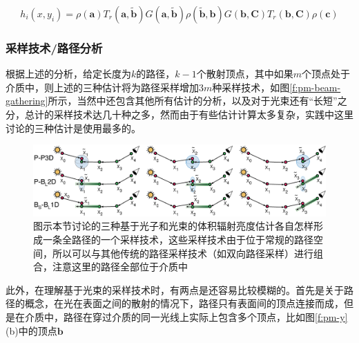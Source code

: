 \begin{equation}
	h_i(x,y_i)=\rho(\mathbf{a})T_r(\mathbf{a},\tilde{\mathbf{b}})G(\mathbf{a},\tilde{\mathbf{b}})\rho(\tilde{\mathbf{b}},\mathbf{b})G(\mathbf{b},\mathbf{C})T_r(\mathbf{b},\mathbf{C})\rho(\mathbf{c})
\end{equation}





\subsubsection{采样技术/路径分析}
根据上述的分析，给定长度为$k$的路径，$k-1$个散射顶点，其中如果$m$个顶点处于介质中，则上述的三种估计将为路径采样增加3$m$种采样技术，如图\ref{f:pm-beam-gathering}所示，当然\cite{a:UnifyingPointsBeamsandPathsinVolumetricLightTransportSimulation}中还包含其他所有估计的分析，以及对于光束还有“长短”之分，总计的采样技术达几十种之多，然而由于有些估计计算太多复杂，实践中这里讨论的三种估计是使用最多的。

\begin{figure}
\begin{fullwidth}
	\includegraphics[width=1.0\thewidth]{figures/pm/beam-sampling}
	\caption{图示本节讨论的三种基于光子和光束的体积辐射亮度估计各自怎样形成一条全路径的一个采样技术，这些采样技术由于位于常规的路径空间，所以可以与其他传统的路径采样技术（如双向路径采样）进行组合，注意这里的路径全部位于介质中}
	\label{f:pm-beam-sampling}
\end{fullwidth}
\end{figure}

此外，在理解基于光束的采样技术时，有两点是还容易比较模糊的。首先是关于路径的概念，在光在表面之间的散射的情况下，路径只有表面间的顶点连接而成，但是在介质中，路径在穿过介质的同一光线上实际上包含多个顶点，比如图\ref{f:pm-y}(b)中的顶点$\mathbf{b}$



